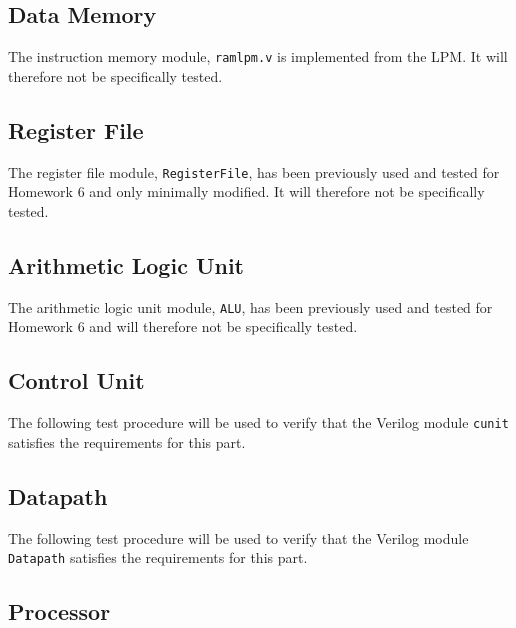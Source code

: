 \subsection{Data Memory} %
\label{sub:data_memory}

The instruction memory module, \verb|ramlpm.v| is implemented from the LPM.
It will therefore not be specifically tested.

\subsection{Register File} %
\label{sub:register_file}

The register file module, \verb|RegisterFile|, has been previously used and tested for Homework 6 and only minimally modified.
It will therefore not be specifically tested.

\subsection{Arithmetic Logic Unit} %
\label{sub:arithmetic_logic_unit}

The arithmetic logic unit module, \verb|ALU|, has been previously used and tested for Homework 6 and will therefore not be specifically tested.

\subsection{Control Unit} %
\label{sub:control_unit}

The following test procedure will be used to verify that the Verilog module \verb|cunit| satisfies the requirements for this part.



\subsection{Datapath} %
\label{sub:datapath}

The following test procedure will be used to verify that the Verilog module \verb|Datapath| satisfies the requirements for this part.



\subsection{Processor} %
\label{sub:processor}

